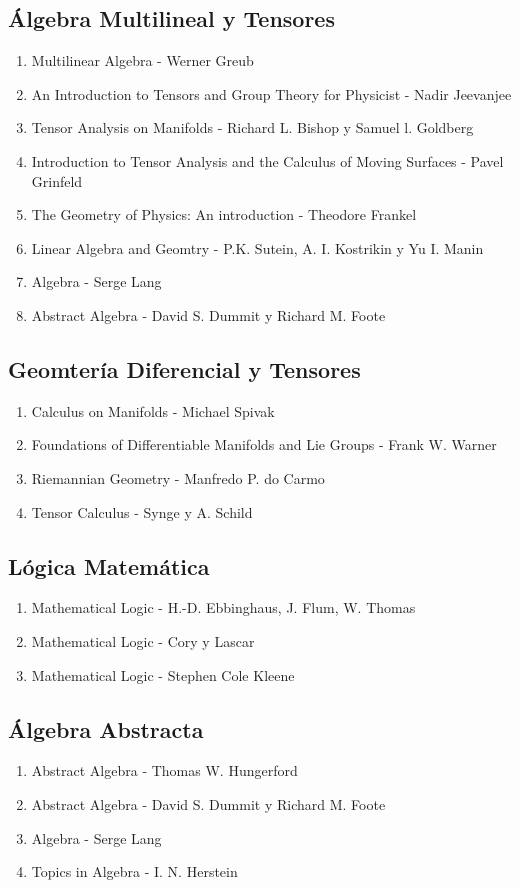 \documentclass{article}
\begin{document}
\subsection{\'Algebra Multilineal y Tensores}
\begin{enumerate}
	\item Multilinear Algebra - Werner Greub
	\item An Introduction to Tensors and Group Theory for Physicist - Nadir Jeevanjee
	\item Tensor Analysis on Manifolds - Richard L. Bishop y Samuel l. Goldberg
	\item Introduction to Tensor Analysis and the Calculus of Moving Surfaces - Pavel Grinfeld
	\item The Geometry of Physics: An introduction - Theodore Frankel
	\item Linear Algebra and Geomtry - P.K. Sutein, A. I. Kostrikin y Yu I. Manin
	\item Algebra - Serge Lang
	\item Abstract Algebra - David S. Dummit y Richard M. Foote
\end{enumerate}
\subsection{Geomter\'ia Diferencial y Tensores}
\begin{enumerate}
	\item Calculus on Manifolds - Michael Spivak
	\item Foundations of Differentiable Manifolds and Lie Groups - Frank W. Warner
	\item Riemannian Geometry - Manfredo P. do Carmo
	\item Tensor Calculus - Synge y A. Schild
\end{enumerate}
\subsection{L\'ogica Matem\'atica}
\begin{enumerate}
	\item Mathematical Logic - H.-D. Ebbinghaus, J. Flum, W. Thomas
	\item Mathematical Logic - Cory y Lascar
	\item Mathematical Logic - Stephen Cole Kleene
\end{enumerate}
\subsection{\'Algebra Abstracta}
\begin{enumerate}
	\item Abstract Algebra - Thomas W. Hungerford
	\item Abstract Algebra - David S. Dummit y Richard M. Foote
	\item Algebra - Serge Lang
	\item Topics in Algebra - I. N. Herstein
\end{enumerate}
\end{document}

